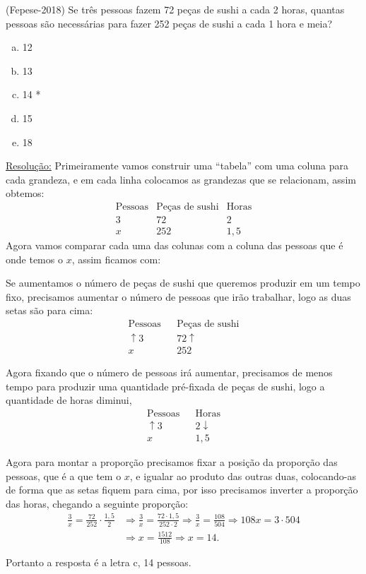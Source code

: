 \begin{exem}
  (Fepese-2018) Se três pessoas fazem 72 peças de sushi a cada 2 horas, quantas pessoas são necessárias para fazer 252 peças de sushi a cada 1 hora e meia?
  \begin{enumerate}[a)]
  \item 12
  \item 13
  \item 14 *
  \item 15
  \item 18
  \end{enumerate}

  \underline{Resolução:}
  Primeiramente vamos construir uma ``tabela'' com uma coluna para cada grandeza, e em cada linha colocamos as grandezas que se relacionam, assim obtemos:
  \begin{eqnarray*}
   \text{Pessoas} & \text{Peças de sushi} & \text{Horas} \\
   3  & 72 & 2  \\
   x  & 252 & 1,5
  \end{eqnarray*}
  Agora vamos comparar cada uma das colunas com a coluna das pessoas que é onde temos o $x$, assim ficamos com:

  Se aumentamos o número de peças de sushi que queremos produzir em um tempo fixo, precisamos aumentar o número de pessoas que irão trabalhar, logo as duas setas são para cima:
  \begin{eqnarray*}
  \text{Pessoas} & & \text{Peças de sushi}  \\
   \uparrow 3 &  & 72 \uparrow  \\
   x &  & 252
  \end{eqnarray*}

  Agora fixando que o número de pessoas irá aumentar, precisamos de menos tempo para produzir uma quantidade pré-fixada de peças de sushi, logo a quantidade de horas diminui,
  \begin{eqnarray*}
   \text{Pessoas} & & \text{Horas} \\
   \uparrow3 & & 2 \downarrow  \\
   x & & 1,5
  \end{eqnarray*}

  Agora para montar a proporção precisamos fixar a posição da proporção das pessoas, que é a que tem o $x$, e igualar ao produto das outras duas, colocando-as de forma que as setas fiquem para cima, por isso precisamos inverter a proporção das horas, chegando a seguinte proporção:
  \begin{align*}
   \frac{3}{x}= \frac{72}{252} \cdot \frac{1,5}{2}
   & \Rightarrow \frac{3}{x}=\frac{72\cdot 1,5}{252 \cdot 2} \Rightarrow \frac{3}{x}=\frac{108}{504} \Rightarrow 108 x= 3 \cdot 504 \\
   & \Rightarrow x=\frac{1512}{108} \Rightarrow x=14.
  \end{align*}

  Portanto a resposta é a letra c, 14 pessoas.
  \fim
\end{exem}

